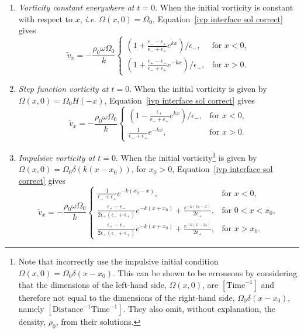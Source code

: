 \documentclass[12pt, draft]{../style-files/ociamthesis}
\begin{document}
\begin{enumerate}
	\item \label{IC1} \textit{Vorticity constant everywhere at $t = 0$}. When the initial vorticity is constant with respect to $x$, \textit{i.e.} $\Omega(x,0) = \Omega_0$, Equation~\eqref{ivp interface sol correct} gives
	\begin{equation}
	\tilde{v}_x = -\frac{\rho_0\omega\Omega_0}{k}
	\begin{cases}
	\left(1 + \frac{\epsilon_- - \epsilon_+}{\epsilon_- + \epsilon_+}e^{kx}\right)/\epsilon_-, & \text{for } x<0, \\
	\left(1 + \frac{\epsilon_+ - \epsilon_-}{\epsilon_- + \epsilon_+}e^{-kx}\right)/\epsilon_+, & \text{for } x>0.
	\end{cases}
	\end{equation}
	\item \label{IC2} \textit{Step function vorticity at $t = 0$}. When the initial vorticity is given by $\Omega(x,0) = \Omega_0H(-x)$, Equation~\eqref{ivp interface sol correct} gives
	\begin{equation}
	\tilde{v}_x = -\frac{\rho_0\omega\Omega_0}{k}
	\begin{cases}
	\left(1 - \frac{\epsilon_+}{\epsilon_- + \epsilon_+}e^{kx}\right)/\epsilon_-, & \text{for } x<0, \\
	\frac{1}{\epsilon_- + \epsilon_+}e^{-kx}, & \text{for } x>0.
	\end{cases}
	\end{equation}
	\item  \label{IC3} \textit{Impulsive vorticity at $t = 0$}. When the initial vorticity\footnote{Note that \cite{rae_etal81} incorrectly use the impulsive initial condition $\Omega(x,0) = \Omega_0\delta(x-x_0)$. This can be shown to be erroneous by considering that the dimensions of the left-hand side, $\Omega(x,0)$, are $[\mathrm{Time}^{-1}]$ and therefore not equal to the dimensions of the right-hand side, $\Omega_0\delta(x-x_0)$, namely $[\mathrm{Distance}^{-1}\mathrm{Time}^{-1}]$. They also omit, without explanation, the density, $\rho_0$, from their solutions.} is given by {$\Omega(x,0) = \Omega_0\delta(k(x-x_0))$}, for $x_0>0$, Equation~\eqref{ivp interface sol correct} gives
	\begin{equation}
	\tilde{v}_x = -\frac{\rho_0\omega\Omega_0}{k}
	\begin{cases}
	\frac{1}{\epsilon_- + \epsilon_+}e^{-k(x_0 - x)}, & \text{for } x < 0, \\
	\frac{\epsilon_+ - \epsilon_-}{2\epsilon_+(\epsilon_- + \epsilon_+)}e^{-k(x + x_0)} + \frac{e^{-k(x_0 - x)}}{2\epsilon_+}, & \text{for } 0<x<x_0, \\
	\frac{\epsilon_+ - \epsilon_-}{2\epsilon_+(\epsilon_- + \epsilon_+)}e^{-k(x + x_0)} + \frac{e^{-k(x - x_0)}}{2\epsilon_+}, & \text{for } x>x_0.
	\end{cases}
	\end{equation}
\end{enumerate}
\end{document}
